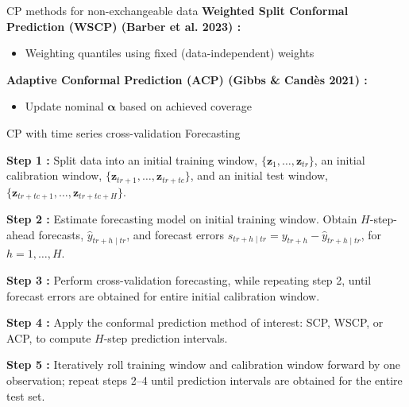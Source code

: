 \documentclass[
  12pt,
  ignorenonframetext,
  aspectratio=169,
]{beamer}
\begin{document}
\begin{frame}{CP methods for non-exchangeable data}
\label{cp-methods-for-non-exchangeable-data}
\color{violet}\textbf{Weighted Split Conformal Prediction (WSCP) (Barber et al. 2023) :}

\begin{itemize}
  \item Weighting quantiles using fixed (data-independent) weights \newline
\end{itemize}
\pause

\color{violet}\textbf{Adaptive Conformal Prediction (ACP) (Gibbs \& Candès 2021) :}

\begin{itemize}
  \item Update nominal $\bm{\alpha}$ based on achieved coverage
\end{itemize}
\end{frame}

\begin{frame}{CP with time series cross-validation Forecasting}
\label{cp-with-time-series-cross-validation-forecasting}
\begin{block}{}
\fontsize{9}{9}\sf
\color{blue} \textbf{Step 1 :} \color{black} Split data into an initial training window, $\{\bm{z}_{1}, \dots, \bm{z}_{tr}\}$, an initial calibration window, $\{\bm{z}_{tr + 1}, \dots, \bm{z}_{tr + tc}\}$, and an initial test window, $\{\bm{z}_{tr + tc + 1}, \dots, \bm{z}_{tr + tc + H}\}$.
\end{block}

\begin{block}{}
\fontsize{9}{9}\sf
\color{violet} \textbf{Step 2 :} \color{black} Estimate forecasting model on initial training window. Obtain $H$-step-ahead forecasts, $\hat{y}_{tr + h \mid tr}$, and forecast errors $s_{tr + h \mid tr} = y_{tr + h} - \hat{y}_{tr + h \mid tr}$, for $h = 1, \dots, H$.
\end{block}

\begin{block}{}
\fontsize{9}{9}\sf
\color{blue} \textbf{Step 3 :} \color{black} Perform cross-validation forecasting, while repeating step 2, until forecast errors are obtained for entire initial calibration window.
\end{block}

\begin{block}{}
\fontsize{9}{9}\sf
\color{violet} \textbf{Step 4 :} \color{black} Apply the conformal prediction method of interest: SCP, WSCP, or ACP, to compute $H$-step prediction intervals.
\end{block}

\begin{block}{}
\fontsize{9}{9}\sf
\color{blue} \textbf{Step 5 :} \color{black} Iteratively roll training window and calibration window forward by one observation; repeat steps 2--4 until prediction intervals are obtained for the entire test set. 
\end{block}
\end{frame}
\end{document}
